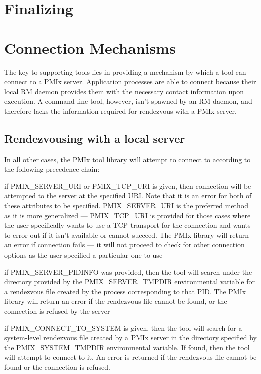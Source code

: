 \section{Finalizing}
\label{chap:api_tools:fini}


\section{Connection Mechanisms}
\label{chap:api_tools:cnct}

The key to supporting tools lies in providing a mechanism by which a tool can connect to a \ac{PMIx} server. Application processes are able to connect because their local \ac{RM} daemon provides them with the necessary contact information upon execution. A command-line tool, however, isn't spawned by an \ac{RM} daemon, and therefore lacks the information required for rendezvous with a \ac{PMIx} server.

\subsection{Rendezvousing with a local server}

In all other cases, the PMIx tool library will attempt to connect to according to the following precedence chain:

if PMIX_SERVER_URI or PMIX_TCP_URI is given, then connection will be attempted to the server at the specified URI. Note that it is an error for both of these attributes to be specified. PMIX_SERVER_URI is the preferred method as it is more generalized — PMIX_TCP_URI is provided for those cases where the user specifically wants to use a TCP transport for the connection and wants to error out if it isn’t available or cannot succeed. The PMIx library will return an error if connection fails — it will not proceed to check for other connection options as the user specified a particular one to use

if PMIX_SERVER_PIDINFO was provided, then the tool will search under the directory provided by the PMIX_SERVER_TMPDIR environmental variable for a rendezvous file created by the process corresponding to that PID. The PMIx library will return an error if the rendezvous file cannot be found, or the connection is refused by the server

if PMIX_CONNECT_TO_SYSTEM is given, then the tool will search for a system-level rendezvous file created by a PMIx server in the directory specified by the PMIX_SYSTEM_TMPDIR environmental variable. If found, then the tool will attempt to connect to it. An error is returned if the rendezvous file cannot be found or the connection is refused.

